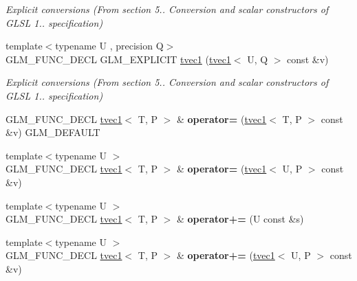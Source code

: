 \begin{DoxyCompactItemize}
\begin{DoxyCompactList}\small\item\em Explicit conversions (From section 5.. Conversion and scalar constructors of G\-L\-S\-L 1.. specification) \end{DoxyCompactList}\item 
\hypertarget{structglm_1_1tvec1_a91828fdb1181e3e95e990aaf23b2db46}{{\footnotesize template$<$typename U , precision Q$>$ }\\G\-L\-M\-\_\-\-F\-U\-N\-C\-\_\-\-D\-E\-C\-L G\-L\-M\-\_\-\-E\-X\-P\-L\-I\-C\-I\-T \hyperlink{structglm_1_1tvec1_a91828fdb1181e3e95e990aaf23b2db46}{tvec1} (\hyperlink{structglm_1_1tvec1}{tvec1}$<$ U, Q $>$ const \&v)}\label{structglm_1_1tvec1_a91828fdb1181e3e95e990aaf23b2db46}

\begin{DoxyCompactList}\small\item\em Explicit conversions (From section 5.. Conversion and scalar constructors of G\-L\-S\-L 1.. specification) \end{DoxyCompactList}\item 
\hypertarget{structglm_1_1tvec1_a317f46cddcdf81865c4970004e294055}{G\-L\-M\-\_\-\-F\-U\-N\-C\-\_\-\-D\-E\-C\-L \hyperlink{structglm_1_1tvec1}{tvec1}$<$ T, P $>$ \& {\bfseries operator=} (\hyperlink{structglm_1_1tvec1}{tvec1}$<$ T, P $>$ const \&v) G\-L\-M\-\_\-\-D\-E\-F\-A\-U\-L\-T}\label{structglm_1_1tvec1_a317f46cddcdf81865c4970004e294055}

\item 
\hypertarget{structglm_1_1tvec1_a472b0f4afb1f9efd1769597027a399f0}{{\footnotesize template$<$typename U $>$ }\\G\-L\-M\-\_\-\-F\-U\-N\-C\-\_\-\-D\-E\-C\-L \hyperlink{structglm_1_1tvec1}{tvec1}$<$ T, P $>$ \& {\bfseries operator=} (\hyperlink{structglm_1_1tvec1}{tvec1}$<$ U, P $>$ const \&v)}\label{structglm_1_1tvec1_a472b0f4afb1f9efd1769597027a399f0}

\item 
\hypertarget{structglm_1_1tvec1_adbaf282ba5770996e346d599f36fe61d}{{\footnotesize template$<$typename U $>$ }\\G\-L\-M\-\_\-\-F\-U\-N\-C\-\_\-\-D\-E\-C\-L \hyperlink{structglm_1_1tvec1}{tvec1}$<$ T, P $>$ \& {\bfseries operator+=} (U const \&s)}\label{structglm_1_1tvec1_adbaf282ba5770996e346d599f36fe61d}

\item 
\hypertarget{structglm_1_1tvec1_af0d6bb22d35f767a748be6fa086c4911}{{\footnotesize template$<$typename U $>$ }\\G\-L\-M\-\_\-\-F\-U\-N\-C\-\_\-\-D\-E\-C\-L \hyperlink{structglm_1_1tvec1}{tvec1}$<$ T, P $>$ \& {\bfseries operator+=} (\hyperlink{structglm_1_1tvec1}{tvec1}$<$ U, P $>$ const \&v)}\label{structglm_1_1tvec1_af0d6bb22d35f767a748be6fa086c4911}


\end{DoxyCompactItemize}
